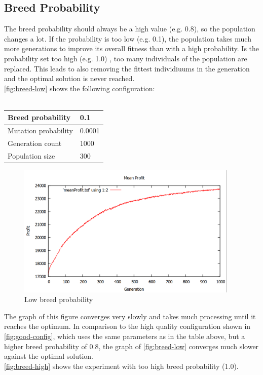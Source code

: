\documentclass[fontsize=12pt,toc=bibliography, notitlepage]{scrreprt}
\begin{document}
\subsection{Breed Probability}
\label{subsec:breed-probability}
The breed probability should always be a high value (e.g. 0.8), so the population changes a lot. If the probability is too low (e.g. 0.1), the population takes much more generations to improve its overall fitness than with a high probability. Is the probability set too high (e.g. 1.0) , too many individuals of the population are replaced. This leads to also removing the fittest individiuums in the generation and the optimal solution is never reached.\\
\autoref{fig:breed-low} shows the following configuration:\\ \\
\begin{tabular}{ |l|l| }
	\hline
	Breed probability & 0.1 \\ \hline
	Mutation probability & 0.0001 \\ \hline
	Generation count & 1000 \\ \hline
	Population size & 300 \\ \hline
\end{tabular}
\begin{figure}[H]
	\centering
	\includegraphics[width=400px]{images/breed-low.png}
	\caption{Low breed probability}
	\label{fig:breed-low}
\end{figure}
The graph of this figure converges very slowly and takes much processing until it reaches the optimum. In comparison to the high quality configuration shown in \autoref{fig:good-config}, which uses the same parameters as in the table above, but a higher
breed probability of 0.8, the graph of \autoref{fig:breed-low} converges much slower against the optimal solution.\\
\autoref{fig:breed-high} shows the experiment with too high breed probability (1.0).
\end{document}
